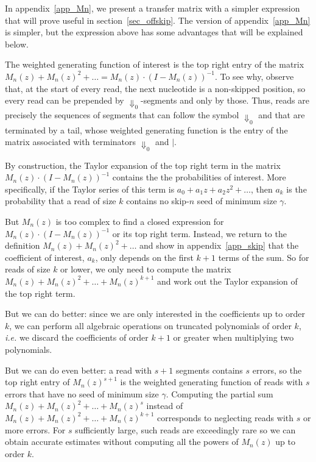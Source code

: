 \documentclass{article}
\begin{document}
In appendix~\ref{app_Mn}, we present a transfer matrix with a simpler
expression that will prove useful in section~\ref{sec_offskip}. The
version of appendix~\ref{app_Mn} is simpler, but the expression above has
some advantages that will be explained below.

The weighted generating function of interest is the top right entry of the
matrix $M_n(z) + M_n(z)^2 + \ldots = M_n(z)\cdot(I-M_n(z))^{-1}$. To see
why, observe that, at the start of every read, the next nucleotide is a
non-skipped position, so every read can be prepended by
$\Downarrow_0$-segments and only by those. Thus, reads are precisely the
sequences of segments that can follow the symbol $\Downarrow_0$ and that
are terminated by a tail, whose weighted generating function is the entry
of the matrix associated with terminators $\Downarrow_0$ and $|$.

By construction, the Taylor expansion of the top right term in the matrix
$M_n(z)\cdot(I-M_n(z))^{-1}$ contains the the probabilities of interest.
More specifically, if the Taylor series of this term is $a_0 + a_1 z + a_2
z^2 + \ldots$, then $a_k$ is the probability that a read of size $k$
contains no skip-$n$ seed of minimum size $\gamma$.

But $M_n(z)$ is too complex to find a closed expression for $M_n(z) \cdot
(I-M_n(z))^{-1}$ or its top right term. Instead, we return to the
definition $M_n(z) + M_n(z)^2 + \ldots$ and show in
appendix~\ref{app_skip} that the coefficient of interest, $a_k$, only
depends on the first $k+1$ terms of the sum. So for reads of size $k$ or
lower, we only need to compute the matrix $M_n(z) + M_n(z)^2 + \ldots +
M_n(z)^{k+1}$ and work out the Taylor expansion of the top right term.

But we can do better: since we are only interested in the coefficients up
to order $k$, we can perform all algebraic operations on truncated
polynomials of order $k$, \textit{i.e.} we discard the coefficients of
order $k+1$ or greater when multiplying two polynomials.

But we can do even better: a read with $s+1$ segments contains $s$ errors,
so the top right entry of $M_n(z)^{s+1}$ is the weighted generating
function of reads with $s$ errors that have no seed of minimum size
$\gamma$. Computing the partial sum $M_n(z) + M_n(z)^2 + \ldots +
M_n(z)^s$ instead of $M_n(z) + M_n(z)^2 + \ldots + M_n(z)^{k+1}$
corresponds to neglecting reads with $s$ or more errors. For $s$
sufficiently large, such reads are exceedingly rare so we can obtain
accurate estimates without computing all the powers of $M_n(z)$ up to
order $k$.
\end{document}

